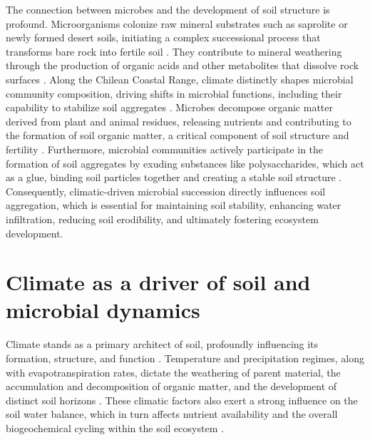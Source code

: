 The connection between microbes and the development of soil structure is profound. Microorganisms colonize raw mineral substrates such as saprolite or newly formed desert soils, initiating a complex successional process that transforms bare rock into fertile soil \citep{Lazaro2008,Stradling2002}. They contribute to mineral weathering through the production of organic acids and other metabolites that dissolve rock surfaces \citep{Bajerski2013,Mavris2010,Styriakova2012}. Along the Chilean Coastal Range, climate distinctly shapes microbial community composition, driving shifts in microbial functions, including their capability to stabilize soil aggregates \citep{Bernhard2018}. Microbes decompose organic matter derived from plant and animal residues, releasing nutrients and contributing to the formation of soil organic matter, a critical component of soil structure and fertility \citep{Oades1993}. Furthermore, microbial communities actively participate in the formation of soil aggregates by exuding substances like polysaccharides, which act as a glue, binding soil particles together and creating a stable soil structure \citep{Martens1992,SchlechtPietsch1994}. Consequently, climatic-driven microbial succession directly influences soil aggregation, which is essential for maintaining soil stability, enhancing water infiltration, reducing soil erodibility, and ultimately fostering ecosystem development.

\section{Climate as a driver of soil and microbial dynamics}
\label{sec:ClimateMicrobialDynamics}

Climate stands as a primary architect of soil, profoundly influencing its formation, structure, and function \citep{Jenny1941}. Temperature and precipitation regimes, along with evapotranspiration rates, dictate the weathering of parent material, the accumulation and decomposition of organic matter, and the development of distinct soil horizons \citep{Scholten2017}. These climatic factors also exert a strong influence on the soil water balance, which in turn affects nutrient availability and the overall biogeochemical cycling within the soil ecosystem \citep{Eldridge2020,Thielen2021}.

